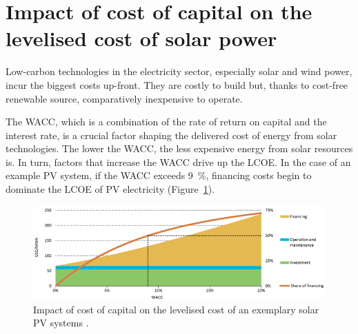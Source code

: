 \section{Impact of cost of capital on the levelised cost of solar power} \label{section WACC}
Low-carbon technologies in the electricity sector, especially solar and wind power, incur the biggest costs up-front. They are costly to build but, thanks to cost-free renewable source, comparatively inexpensive to operate.


The \ac{WACC}, which is a combination of the rate of return on capital and the interest rate, is a crucial factor shaping the delivered cost of energy from solar technologies. The lower the \ac{WACC}, the less expensive energy from solar resources is. In turn, factors that increase the \ac{WACC} drive up the \ac{LCOE}. In the case of an example \ac{PV} system, if the \ac{WACC} exceeds \SI{9}{\percent}, financing costs begin to dominate the \ac{LCOE} of \ac{PV} electricity (Figure~\ref{WACC}).

\begin{figure}[htbp]  
\centering
\includegraphics[width=1\linewidth]{FIG/WACC}
\caption[Impact of cost of capital on the levelised cost of an exemplary solar PV systems.]{Impact of cost of capital on the levelised cost of an exemplary solar PV systems \cite{IEA2015}.}\label{WACC}
\end{figure}


